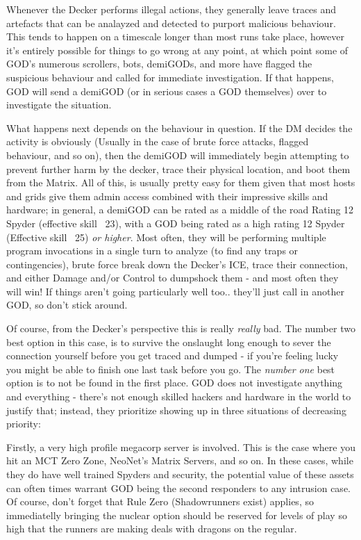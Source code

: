 \begin{multicols}{3}
	Whenever the Decker performs illegal actions, they generally leave traces and artefacts that can be analayzed and detected to purport malicious behaviour. This tends to happen on a timescale longer than most runs take place, however it's entirely possible for things to go wrong at any point, at which point some of GOD's numerous scrollers, bots, demiGODs, and more have flagged the suspicious behaviour and called for immediate investigation. If that happens, GOD will send a demiGOD (or in serious cases a GOD themselves) over to investigate the situation.
	
	What happens next depends on the behaviour in question. If the DM decides the activity is obviously (Usually in the case of brute force attacks, flagged behaviour, and so on), then the demiGOD will immediately begin attempting to prevent further harm by the decker, trace their physical location, and boot them from the Matrix. All of this, is usually pretty easy for them given that most hosts and grids give them admin access combined with their impressive skills and hardware; in general, a demiGOD can be rated as a middle of the road Rating 12 Spyder (effective skill ~23), with a GOD being rated as a high rating 12 Spyder (Effective skill ~25) \textit{or higher}. Most often, they will be performing multiple program invocations in a single turn to analyze (to find any traps or contingencies), brute force break down the Decker's ICE, trace their connection, and either Damage and/or Control to dumpshock them - and most often they will win! If things aren't going particularly well too.. they'll just call in another GOD, so don't stick around.
	
	Of course, from the Decker's perspective this is really \textit{really} bad. The number two best option in this case, is to survive the onslaught long enough to sever the connection yourself before you get traced and dumped - if you're feeling lucky you might be able to finish one last task before you go. The \textit{number one} best option is to not be found in the first place. GOD does not investigate anything and everything - there's not enough skilled hackers and hardware in the world to justify that; instead, they prioritize showing up in three situations of decreasing priority: 
	
	Firstly, a very high profile megacorp server is involved. This is the case where you hit an MCT Zero Zone, NeoNet's Matrix Servers, and so on. In these cases, while they do have well trained Spyders and security, the potential value of these assets can often times warrant GOD being the second responders to any intrusion case. Of course, don't forget that Rule Zero (Shadowrunners exist) applies, so immediatelly bringing the nuclear option should be reserved for levels of play so high that the runners are making deals with dragons on the regular.
	

\end{multicols}
